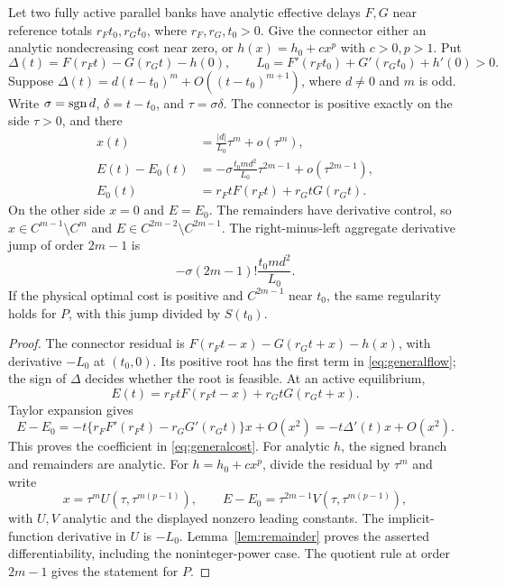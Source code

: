 \begin{proposition}\label{prop:localcontact}
Let two fully active parallel banks have analytic effective delays $F,G$ near reference totals $r_Ft_0,r_Gt_0$, where $r_F,r_G,t_0>0$. Give the connector either an analytic nondecreasing cost near zero, or $h(x)=h_0+c x^p$ with $c>0,p>1$. Put
\begin{equation}\label{eq:generalcontact}
 \Delta(t)=F(r_Ft)-G(r_Gt)-h(0),\qquad
 L_0=F'(r_Ft_0)+G'(r_Gt_0)+h'(0)>0.
\end{equation}
Suppose $\Delta(t)=d(t-t_0)^m+O((t-t_0)^{m+1})$, where $d\ne0$ and $m$ is odd. Write $\sigma=\operatorname{sgn} d$, $\delta=t-t_0$, and $\tau=\sigma\delta$. The connector is positive exactly on the side $\tau>0$, and there
\begin{align}
 x(t)&=\frac{|d|}{L_0}\tau^m+o(\tau^m),\label{eq:generalflow}\\
 E(t)-E_0(t)&=-\sigma\frac{t_0m d^2}{L_0}\tau^{2m-1}+o(\tau^{2m-1}),\label{eq:generalcost}\\
 E_0(t)&=r_FtF(r_Ft)+r_GtG(r_Gt).\nonumber
\end{align}
On the other side $x=0$ and $E=E_0$. The remainders have derivative control, so $x\in C^{m-1}\setminus C^m$ and $E\in C^{2m-2}\setminus C^{2m-1}$. The right-minus-left aggregate derivative jump of order $2m-1$ is
\begin{equation}\label{eq:generaljump}
 -\sigma(2m-1)!\frac{t_0m d^2}{L_0}.
\end{equation}
If the physical optimal cost is positive and $C^{2m-1}$ near $t_0$, the same regularity holds for $P$, with this jump divided by $S(t_0)$.
\end{proposition}
\begin{proof}
The connector residual is $F(r_Ft-x)-G(r_Gt+x)-h(x)$, with derivative $-L_0$ at $(t_0,0)$. Its positive root has the first term in \eqref{eq:generalflow}; the sign of $\Delta$ decides whether the root is feasible. At an active equilibrium,
\begin{equation}
 E(t)=r_FtF(r_Ft-x)+r_GtG(r_Gt+x).
\end{equation}
Taylor expansion gives
\begin{equation}\label{eq:raycancellation}
 E-E_0=-t\{r_FF'(r_Ft)-r_GG'(r_Gt)\}x+O(x^2)
       =-t\Delta'(t)x+O(x^2).
\end{equation}
This proves the coefficient in \eqref{eq:generalcost}. For analytic $h$, the signed branch and remainders are analytic. For $h=h_0+cx^p$, divide the residual by $\tau^m$ and write
\begin{equation}
 x=\tau^m U(\tau,\tau^{m(p-1)}),\qquad
 E-E_0=\tau^{2m-1}V(\tau,\tau^{m(p-1)}),
\end{equation}
with $U,V$ analytic and the displayed nonzero leading constants. The implicit-function derivative in $U$ is $-L_0$. Lemma~\ref{lem:remainder} proves the asserted differentiability, including the noninteger-power case. The quotient rule at order $2m-1$ gives the statement for $P$.
\end{proof}


